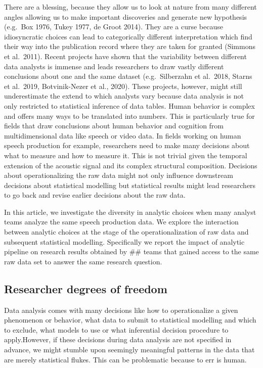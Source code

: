 \documentclass[
  english,
  man]{apa6}
\begin{document}
There are a blessing, because they allow us to look at nature from many different angles allowing us to make important discoveries and generate new hypothesis (e.g.~Box 1976, Tukey 1977, de Groot 2014). They are a curse because idiosyncratic choices can lead to categorically different interpretation which find their way into the publication record where they are taken for granted (Simmons et al.~2011). Recent projects have shown that the variability between different data analysts is immense and leads researchers to draw vastly different conclusions about one and the same dataset (e.g.~Silberzahn et al.~2018, Starns et al.~2019, Botvinik-Nezer et al., 2020). These projects, however, might still underestimate the extend to which analysts vary because data analysis is not only restricted to statistical inference of data tables. Human behavior is complex and offers many ways to be translated into numbers. This is particularly true for fields that draw conclusions about human behavior and cognition from multidimensional data like speech or video data. In fields working on human speech production for example, researchers need to make many decisions about what to measure and how to measure it. This is not trivial given the temporal extension of the acoustic signal and its complex structural composition. Decisions about operationalizing the raw data might not only influence downstream decisions about statistical modelling but statistical results might lead researchers to go back and revise earlier decisions about the raw data.

In this article, we investigate the diversity in analytic choices when many analyst teams analyze the same speech production data. We explore the interaction between analytic choices at the stage of the operationalization of raw data and subsequent statistical modelling. Specifically we report the impact of analytic pipeline on research results obtained by \#\# teams that gained access to the same raw data set to answer the same research question.

\hypertarget{researcher-degrees-of-freedom}{%
\subsection{Researcher degrees of freedom}\label{researcher-degrees-of-freedom}}

Data analysis comes with many decisions like how to operationalize a given phenomenon or behavior, what data to submit to statistical modelling and which to exclude, what models to use or what inferential decision procedure to apply.However, if these decisions during data analysis are not specified in advance, we might stumble upon seemingly meaningful patterns in the data that are merely statistical flukes. This can be problematic because to err is human.
\end{document}
